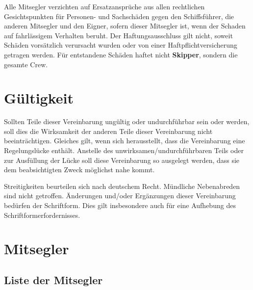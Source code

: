 \documentclass[a4paper,12pt]{article}
\newcommand{\skipper}{\textbf{Skipper}}
\begin{document}
Alle Mitsegler verzichten auf Ersatzansprüche aus allen rechtlichen Gesichtspunkten für Per\-so\-nen- und Sachschäden gegen den Schiffsführer, die anderen Mitsegler und den Eigner, sofern dieser Mitsegler ist, wenn der Schaden auf fahrlässigem Verhalten beruht.
Der Haftungsausschluss gilt nicht, soweit Schäden vorsätzlich verursacht wurden oder von einer Haftpflichtversicherung getragen werden.
Für entstandene Schäden haftet nicht \skipper, sondern die gesamte Crew.


\section{Gültigkeit}
\label{sec:Gueltigkeit}

Sollten Teile dieser Vereinbarung ungültig oder undurchführbar sein oder werden, soll dies die Wirksamkeit der anderen Teile dieser Vereinbarung nicht beeinträchtigen.
Gleiches gilt, wenn sich herausstellt, dass die Vereinbarung eine Regelungslücke enthält.
Anstelle des unwirksamen/undurchführbaren Teils oder zur Ausfüllung der Lücke soll diese Vereinbarung so ausgelegt werden, dass sie dem beabsichtigten Zweck möglichst nahe kommt.

Streitigkeiten beurteilen sich nach deutschem Recht.
Mündliche Nebenabreden sind nicht getroffen.
Änderungen und/oder Ergänzungen dieser Vereinbarung bedürfen der Schriftform.
Dies gilt insbesondere auch für eine Aufhebung des Schriftformerfordernisses.


\section{Mitsegler}
\label{sec:Mitsegler}

\subsection*{Liste der Mitsegler}
\end{document}
